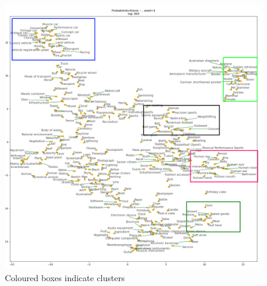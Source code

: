 \begin{figure}[H]
    \centering
    \includegraphics[width=\textwidth]{images/method/probabilistic_independent/top300_tsne_openimages__ProbabilisticGlove_1_clusters.png}
    \caption{
        Coloured boxes indicate clusters 
    }
\end{figure}

